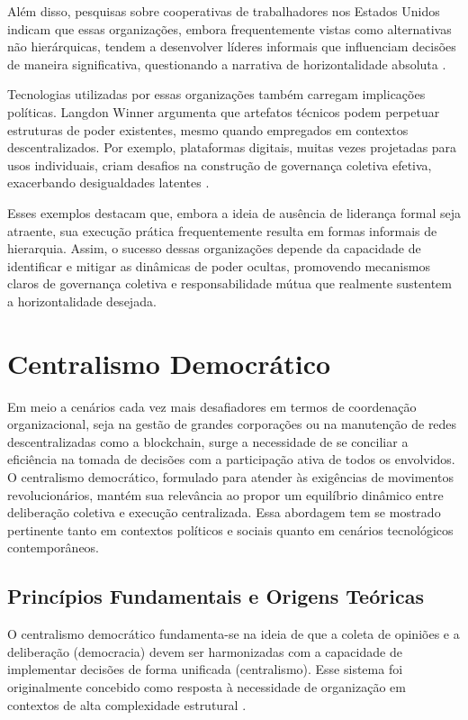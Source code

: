 Além disso, pesquisas sobre cooperativas de trabalhadores nos Estados
Unidos indicam que essas organizações, embora frequentemente vistas como
alternativas não hierárquicas, tendem a desenvolver líderes informais que
influenciam decisões de maneira significativa, questionando a narrativa de
horizontalidade absoluta \cite{WorkerCooperativesandRevolution}.

Tecnologias utilizadas por essas organizações também carregam implicações
políticas. Langdon Winner argumenta que artefatos técnicos podem perpetuar
estruturas de poder existentes, mesmo quando empregados em contextos
descentralizados. Por exemplo, plataformas digitais, muitas vezes
projetadas para usos individuais, criam desafios na construção de
governança coletiva efetiva, exacerbando desigualdades latentes
\cite{DoArtifactsHavePolitics}.

Esses exemplos destacam que, embora a ideia de ausência de liderança formal
seja atraente, sua execução prática frequentemente resulta em formas
informais de hierarquia. Assim, o sucesso dessas organizações depende da
capacidade de identificar e mitigar as dinâmicas de poder ocultas,
promovendo mecanismos claros de governança coletiva e responsabilidade
mútua que realmente sustentem a horizontalidade desejada.

\section{Centralismo Democrático}
\label{sec:centralismo_democratico}

Em meio a cenários cada vez mais desafiadores em termos de coordenação
organizacional, seja na gestão de grandes corporações ou na manutenção
de redes descentralizadas como a blockchain, surge a necessidade de se
conciliar a eficiência na tomada de decisões com a participação ativa
de todos os envolvidos. O centralismo democrático, formulado para
atender às exigências de movimentos revolucionários, mantém sua
relevância ao propor um equilíbrio dinâmico entre deliberação coletiva
e execução centralizada. Essa abordagem tem se mostrado pertinente
tanto em contextos políticos e sociais quanto em cenários tecnológicos
contemporâneos.

\subsection{Princípios Fundamentais e Origens Teóricas}
\label{sec:principios_origens_teoricas}

O centralismo democrático fundamenta-se na ideia de que a coleta de
opiniões e a deliberação (democracia) devem ser harmonizadas com a
capacidade de implementar decisões de forma unificada (centralismo).
Esse sistema foi originalmente concebido como resposta à necessidade
de organização em contextos de alta complexidade estrutural 
\cite{StillaCenturyoftheChineseModel,EstatutosDoPCP}.

